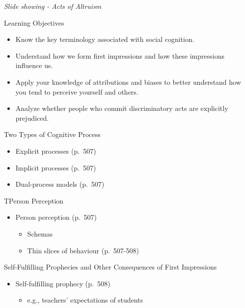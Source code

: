 \documentclass[
]{book}
\providecommand{\tightlist}{%
  \setlength{\itemsep}{0pt}\setlength{\parskip}{0pt}}
\begin{document}
\begin{reflect}
\emph{Slide showing - Acts of Altruism}

Learning Objectives

\begin{itemize}
\tightlist
\item
  Know the key terminology associated with social cognition.\\
\item
  Understand how we form first impressions and how these impressions influence us.\\
\item
  Apply your knowledge of attributions and biases to better understand how you tend to perceive yourself and others.\\
\item
  Analyze whether people who commit discriminatory acts are explicitly prejudiced.
\end{itemize}

Two Types of Cognitive Process

\begin{itemize}
\tightlist
\item
  Explicit processes (p.~507)\\
\item
  Implicit processes (p.~507)\\
\item
  Dual-process models (p.~507)
\end{itemize}

TPerson Perception

\begin{itemize}
\tightlist
\item
  Person perception (p.~507)

  \begin{itemize}
  \tightlist
  \item
    Schemas\\
  \item
    Thin slices of behaviour (p.~507-508)
  \end{itemize}
\end{itemize}

Self-Fulfilling Prophecies and Other Consequences of First Impressions

\begin{itemize}
\tightlist
\item
  Self-fulfilling prophecy (p.~508)

  \begin{itemize}
  \tightlist
  \item
    e.g., teachers' expectations of students
  \end{itemize}
\end{itemize}


\end{reflect}
\end{document}
